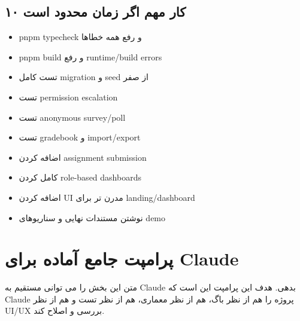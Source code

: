 \documentclass[11pt,a4paper]{article}
\begin{document}
\subsection{۱۰ کار مهم اگر زمان محدود است}
\begin{itemize}
\item pnpm typecheck و رفع همه خطاها
\item pnpm build و رفع runtime/build errors
\item تست کامل migration و seed از صفر
\item تست permission escalation
\item تست anonymous survey/poll
\item تست gradebook و import/export
\item اضافه کردن assignment submission
\item کامل کردن role-based dashboards
\item اضافه کردن UI مدرن تر برای landing/dashboard
\item نوشتن مستندات نهایی و سناریوهای demo
\end{itemize}

\section{پرامپت جامع آماده برای Claude}
متن این بخش را می توانی مستقیم به Claude بدهی. هدف این پرامپت این است که Claude پروژه را هم از نظر باگ، هم از نظر معماری، هم از نظر تست و هم از نظر UI/UX بررسی و اصلاح کند.
\end{document}
